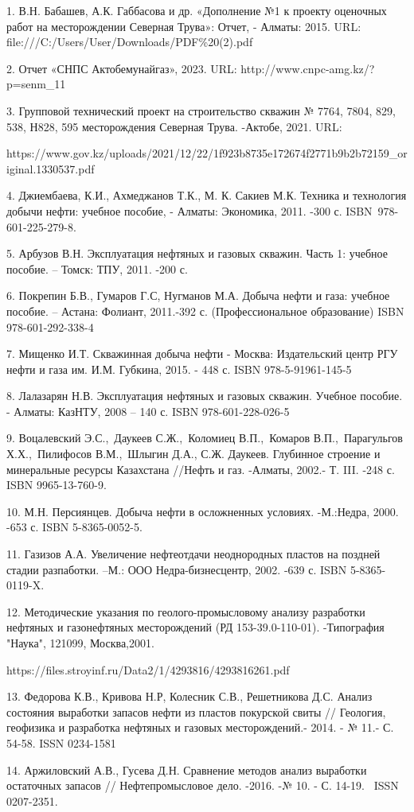 \begin{noparindent}
1. В.Н. Бабашев, А.К. Габбасова и др. «Дополнение №1 к проекту оценочных
работ на месторождении Северная Трува»: Отчет, - Алматы: 2015. URL: file:///C:/Users/User/Downloads/PDF\%20(2).pdf

2. Отчет «СНПС Актобемунайгаз», 2023. URL:
http://www.cnpc-amg.kz/?p=senm\_11

3. Групповой технический проект на строительство скважин № 7764, 7804,
829, 538, Н828, 595 месторождения Северная Трува. -Актобе, 2021. URL:

https://www.gov.kz/uploads/2021/12/22/1f923b8735e172674f2771b9b2b72159\_original.1330537.pdf

4.
Джиембаева, К.И., Ахмеджанов Т.К., М. К. Сакиев М.К. Техника и
технология добычи нефти: учебное пособие, - Алматы: Экономика, 2011.
-300 с. ISBN~978-601-225-279-8.

5.
Арбузов В.Н. Эксплуатация нефтяных и газовых скважин. Часть 1: учебное
пособие. -- Томск: ТПУ, 2011. -200 с.

6.
Покрепин Б.В., Гумаров Г.С, Нугманов М.А. Добыча нефти и газа: учебное
пособие. -- Астана: Фолиант, 2011.-392 с. (Профессиональное
образование) ISBN 978-601-292-338-4~

7.
Мищенко И.Т. Скважинная добыча нефти - Москва: Издательский центр РГУ
нефти и газа им. И.М. Губкина, 2015. - 448 с. ISBN 978-5-91961-145-5

8.
Лалазарян Н.В. Эксплуатация нефтяных и газовых скважин. Учебное
пособие. - Алматы: КазНТУ, 2008 -- 140 с. ISBN 978-601-228-026-5

9.
Воцалевский Э.С.,~Даукеев С.Ж.,~Коломиец В.П.,~Комаров
В.П.,~Парагульгов Х.Х.,~Пилифосов В.М.,~Шлыгин Д.А., С.Ж. Даукеев.
Глубинное строение и минеральные ресурсы Казахстана //Нефть и газ.
-Алматы, 2002.- Т. III. -248 с. ISBN 9965-13-760-9.

10.
М.Н. Персиянцев. Добыча нефти в осложненных условиях. -М.:Недра, 2000.
-653 с. ISBN 5-8365-0052-5.

11.
Газизов А.А. Увеличение нефтеотдачи неоднородных пластов на поздней
стадии разпаботки. --М.: ООО Недра-бизнесцентр, 2002. -639 с. ISBN
5-8365-0119-X.

12.
Методические указания по геолого-промысловому анализу разработки
нефтяных и газонефтяных месторождений (РД 153-39.0-110-01).
-Типография "Наука", 121099, Москва,2001.

https://files.stroyinf.ru/Data2/1/4293816/4293816261.pdf

13.
Федорова К.В., Кривова Н.Р, Колесник С.В., Решетникова Д.С. Анализ
состояния выработки запасов нефти из пластов покурской свиты //
Геология, геофизика и разработка нефтяных и газовых месторождений.-
2014. - № 11.- С. 54-58. ISSN 0234-1581

14.
Аржиловский А.В., Гусева Д.Н. Сравнение методов анализ выработки
остаточных запасов // Нефтепромысловое дело. -2016. -№ 10. - С. 14-19.
~ISSN 0207-2351.
\end{noparindent}

